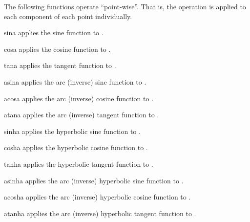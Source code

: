 \noindent The following functions operate ``point-wise''.
That is, the operation is applied to each component of each point individually.

\begin{funcdesc}{sin}{a}
applies the sine function to .
\end{funcdesc}

\begin{funcdesc}{cos}{a}
applies the cosine function to .
\end{funcdesc}

\begin{funcdesc}{tan}{a}
applies the tangent function to .
\end{funcdesc}

\begin{funcdesc}{asin}{a}
applies the arc (inverse) sine function to .
\end{funcdesc}

\begin{funcdesc}{acos}{a}
applies the arc (inverse) cosine function to .
\end{funcdesc}

\begin{funcdesc}{atan}{a}
applies the arc (inverse) tangent function to .
\end{funcdesc}

\begin{funcdesc}{sinh}{a}
applies the hyperbolic sine function to .
\end{funcdesc}

\begin{funcdesc}{cosh}{a}
applies the hyperbolic cosine function to .
\end{funcdesc}

\begin{funcdesc}{tanh}{a}
applies the hyperbolic tangent function to .
\end{funcdesc}

\begin{funcdesc}{asinh}{a}
applies the arc (inverse) hyperbolic sine function to .
\end{funcdesc}

\begin{funcdesc}{acosh}{a}
applies the arc (inverse) hyperbolic cosine function to .
\end{funcdesc}

\begin{funcdesc}{atanh}{a}
applies the arc (inverse) hyperbolic tangent function to .
\end{funcdesc}

